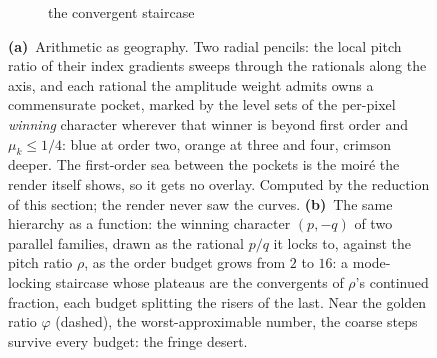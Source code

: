 \begin{figure}[t]
\begin{subfigure}{\linewidth}
    \caption{the convergent staircase}
    \label{fig:selection-fan}
  \end{subfigure}
  \caption{
  \textbf{(a)}~Arithmetic as geography.
  Two radial pencils: the local pitch ratio of their index gradients sweeps
  through the rationals along the axis, and each rational the amplitude
  weight admits owns a commensurate pocket, marked by the level sets of the
  per-pixel \emph{winning} character wherever that winner is beyond first
  order and $\mu_k\le1/4$: blue at order two, orange at three and four,
  crimson deeper. The first-order sea between the pockets is the moir\'e the
  render itself shows, so it gets no overlay. Computed by the reduction of
  this section; the render never saw the curves.
  \textbf{(b)}~The same hierarchy as a function: the winning character
  $(p,-q)$ of two parallel families, drawn as the rational $p/q$ it locks
  to, against the pitch ratio $\rho$, as the order budget grows from $2$ to
  $16$: a mode-locking staircase whose plateaus are the convergents of
  $\rho$'s continued fraction, each budget splitting the risers of the last.
  Near the golden ratio $\varphi$ (dashed), the worst-approximable number,
  the coarse steps survive every budget: the fringe desert.}
  \label{fig:selection}
\end{figure}

